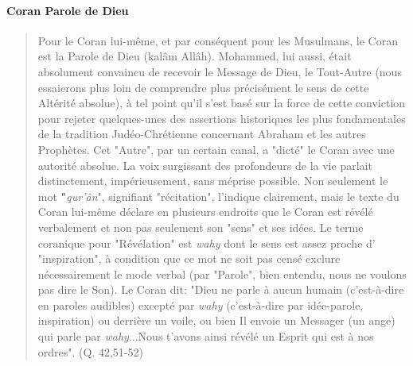 \paragraph{Coran Parole de Dieu}

 \begin{quote}
     

Pour le Coran lui-même, et par conséquent pour les Musulmans, le Coran
est la Parole de Dieu (kalâm Allâh). Mohammed, lui aussi, était
absolument convaincu de recevoir le Message de Dieu, le Tout-Autre (nous
essaierons plus loin de comprendre plus précisément le sens de cette
Altérité absolue), à tel point qu'il s'est basé sur la force de cette
conviction pour rejeter quelques-unes des assertions historiques les
plus fondamentales de la tradition Judéo-Chrétienne concernant Abraham
et les autres Prophètes. Cet "Autre", par un certain canal, a "dicté" le
Coran avec une autorité absolue. La voix surgissant des profondeurs de
la vie parlait distinctement, impérieusement, sans méprise possible. Non
seulement le mot \textbf{"}\emph{qur'ân}", signifiant "récitation",
l'indique clairement, mais le texte du Coran lui-même déclare en
plusieurs endroits que le Coran est révélé verbalement et non pas
seulement son "sens" et ses idées. Le terme coranique pour "Révélation"
est \emph{wahy} dont le sens est assez proche d' "inspiration", à
condition que ce mot ne soit pas censé exclure nécessairement le mode
verbal (par "Parole", bien entendu, nous ne voulons pas dire le Son). Le
Coran dit: "Dieu ne parle à aucun humain (c'est-à-dire en paroles
audibles) excepté par \emph{wahy} (c'est-à-dire par idée-parole,
inspiration) ou derrière un voile, ou bien Il envoie un Messager (un
ange) qui parle par \emph{wahy}...Nous t'avons ainsi révélé un Esprit
qui est à nos ordres". (Q. 42,51-52)



\end{quote}
